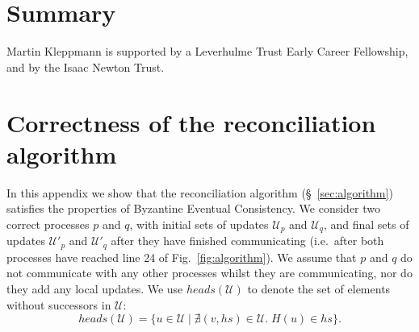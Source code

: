\documentclass[manuscript,anonymous]{acmart}
\begin{document}





\section{Summary}

\begin{acks}
Martin Kleppmann is supported by a Leverhulme Trust Early Career Fellowship, and by the Isaac Newton Trust.
\end{acks}




\appendix
\section{Correctness of the reconciliation algorithm}

In this appendix we show that the reconciliation algorithm (\S~\ref{sec:algorithm}) satisfies the properties of Byzantine Eventual Consistency.
We consider two correct processes $p$ and $q$, with initial sets of updates $\mathcal{U}_p$ and $\mathcal{U}_q$, and final sets of updates $\mathcal{U}'_p$ and $\mathcal{U}'_q$ after they have finished communicating (i.e.\ after both processes have reached line 24 of Fig.~\ref{fig:algorithm}).
We assume that $p$ and $q$ do not communicate with any other processes whilst they are communicating, nor do they add any local updates.
We use $\mathit{heads}(\mathcal{U})$ to denote the set of elements without successors in $\mathcal{U}$:
\[ \mathit{heads}(\mathcal{U}) = \{u \in \mathcal{U} \mid \nexists (v, \mathit{hs}) \in \mathcal{U}.\; H(u) \in \mathit{hs}\}. \]
\end{document}
